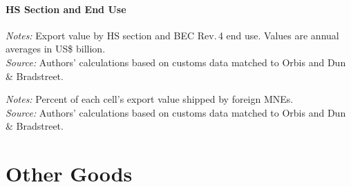 \documentclass[11pt,a4paper]{article}
\begin{document}
\subsection{HS Section and End Use}
\begin{table}[H]\centering\small%
  \caption{Mining and Fuels: Exports by HS Section and End Use}%
  \label{tab:sxe_v_mining}%
  \par\vspace{3pt}%
  \begin{minipage}{0.95\textwidth}\footnotesize %
  \textit{Notes:} Export value by HS section and BEC Rev.\,4 end use. Values are annual averages in US\$ billion.\\[3pt]%
  \textit{Source:} Authors' calculations based on customs data matched to Orbis and Dun \& Bradstreet.%
  \end{minipage}%
  \end{table}
\begin{table}[H]\centering\small%
  \caption{Mining and Fuels: Foreign-Multinational Share of Exports by HS Section and End Use}%
  \label{tab:sxe_f_mining}%
  \par\vspace{3pt}%
  \begin{minipage}{0.95\textwidth}\footnotesize %
  \textit{Notes:} Percent of each cell's export value shipped by foreign MNEs.\\[3pt]%
  \textit{Source:} Authors' calculations based on customs data matched to Orbis and Dun \& Bradstreet.%
  \end{minipage}%
  \end{table}
\clearpage\part{Other Goods}
\end{document}
